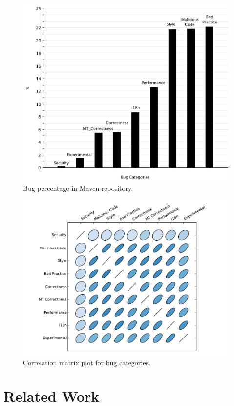 \documentclass{sig-alternate}
\begin{document}
\begin{figure}[t]
	\centering
	\includegraphics[scale=0.38]{figures/bug_percent}
	\caption{Bug percentage in Maven repository.}
	\label{fig:bug-per} 
\end{figure}

\begin{figure}
  \centering
  \includegraphics[scale=0.43]{corrplot.pdf}
  \caption{Correlation matrix plot for bug categories.}
  \label{fig:corrplot}
\end{figure}

\section{Related Work}
\label{sec:rel}
\end{document}

